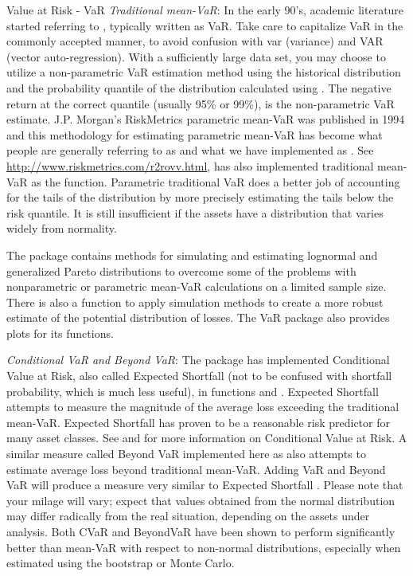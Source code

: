 \documentclass[12pt,letterpaper,english]{article}
\begin{document}
\begin{Section}{Value at Risk - VaR}
\emph{Traditional mean-VaR}:
In the early 90's, academic literature started referring to , typically written as VaR. Take care to capitalize VaR in the commonly accepted manner, to avoid confusion with var (variance) and VAR (vector auto-regression).  With a sufficiently large data set, you may choose to utilize a non-parametric VaR estimation method using the historical distribution and the probability quantile of the distribution calculated using . The negative return at the correct quantile (usually 95\% or 99\%), is the non-parametric VaR estimate.  J.P. Morgan's RiskMetrics parametric mean-VaR was published in 1994 and this methodology for estimating parametric mean-VaR has become what people are generally referring to as  and what we have implemented as .  See \Cite{Return to RiskMetrics: Evolution of a Standard}\url{http://www.riskmetrics.com/r2rovv.html},  has also implemented traditional mean-VaR as the  function.  Parametric traditional VaR does a better job of accounting for the tails of the distribution by more precisely estimating the tails below the risk quantile.  It is still insufficient if the assets have a distribution that varies widely from normality.

The \R{} package  contains methods for simulating and estimating lognormal  and generalized Pareto  distributions to overcome some of the problems with nonparametric or parametric mean-VaR calculations on a limited sample size.  There is also a  function to apply simulation methods to create a more robust estimate of the potential distribution of losses.  The VaR package also provides plots for its functions.

\emph{Conditional VaR and Beyond VaR}:
The  package has implemented Conditional Value at Risk, also called Expected Shortfall (not to be confused with shortfall probability, which is much less useful), in functions  and .  Expected Shortfall attempts to measure the magnitude of the average loss exceeding the traditional mean-VaR. Expected Shortfall has proven to be a reasonable risk predictor for many asset classes.  See \Cite{Uryasev(2000)} and \Cite{Sherer and Martin(2005)} for more information on Conditional Value at Risk.  A similar measure called Beyond VaR implemented here as  also attempts to estimate average loss beyond traditional mean-VaR.  Adding VaR and Beyond VaR will produce a measure very similar to Expected Shortfall . Please note that your milage will vary; expect that values obtained from the normal distribution may differ radically from the real situation, depending on the assets under analysis.  Both CVaR and BeyondVaR have been shown to perform significantly better than mean-VaR with respect to non-normal distributions, especially when estimated using the bootstrap or Monte Carlo.


\end{Section}
\end{document}
